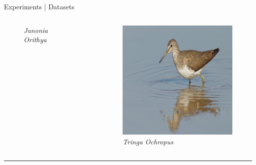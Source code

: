 \begin{frame}{Experiments | Datasets}
\begin{columns}
\begin{column}{0.2\textwidth}
\begin{figure}
        \captionsetup{labelformat=empty, justification=centering, font=scriptsize}
        \caption{\emph{Junonia Orithya}}
      \end{figure}
    \end{column}
    \begin{column}{0.2\textwidth}
      \begin{figure}
        \centering
        \includegraphics[width=.7\linewidth]{figures/04/iNaturalist19/example_3.jpg}
        \captionsetup{labelformat=empty, justification=centering, font=scriptsize}
        \caption{\emph{Tringa Ochropus}}
      \end{figure}
    \end{column}
  \end{columns}

  \rule{\linewidth}{0.4pt}


\end{frame}
